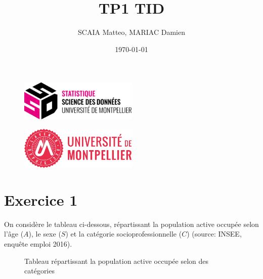 \documentclass{article}
\title{TP1 TID}
\author{SCAIA Matteo, MARIAC Damien}
\date{\today}
\begin{document}
\maketitle

\begin{figure}[h] 
    \centering
    \includegraphics[width=0.5\textwidth]{ssd_logo.png} 
\end{figure}

\begin{figure}[h] 
    \centering
    \includegraphics[width=0.5\textwidth]{logo_um_2022_rouge_RVB.png} 
\end{figure}

\newpage

\tableofcontents

\newpage

\section{Exercice 1}
On considère le tableau ci-dessous, répartissant la population active occupée selon l'âge ($A$), le sexe ($S$) et la
catégorie socioprofessionnelle ($C$) (source: INSEE, enquête emploi 2016).
\begin{figure}[ht]
  \centering
  \setlength{\fboxsep}{0pt}  %
  \setlength{\fboxrule}{1pt}  %
  \caption{Tableau répartissant la population active occupée selon des catégories }
\end{figure}
\end{document}
